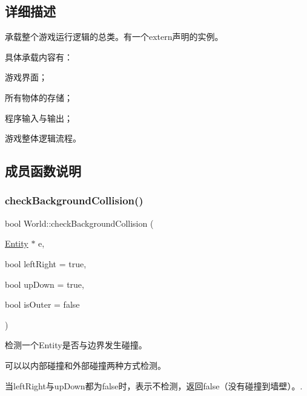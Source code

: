 \subsection{详细描述}
承载整个游戏运行逻辑的总类。有一个extern声明的实例。 

具体承载内容有：
\begin{DoxyEnumerate}
\item 游戏界面；
\item 所有物体的存储；
\item 程序输入与输出；
\item 游戏整体逻辑流程。 
\end{DoxyEnumerate}

\subsection{成员函数说明}
\mbox{\label{class_world_a3b447a1788dc0d2e507dce41486ad1b4}} 
\subsubsection{\texorpdfstring{check\+Background\+Collision()}{checkBackgroundCollision()}}
{\footnotesize\ttfamily bool World\+::check\+Background\+Collision (\begin{DoxyParamCaption}\item[{\hyperlink{class_entity}{Entity} $\ast$}]{e,  }\item[{bool}]{left\+Right = {\ttfamily true},  }\item[{bool}]{up\+Down = {\ttfamily true},  }\item[{bool}]{is\+Outer = {\ttfamily false} }\end{DoxyParamCaption})\hspace{0.3cm}{\ttfamily [private]}}



检测一个\+Entity是否与边界发生碰撞。 

可以以内部碰撞和外部碰撞两种方式检测。

当left\+Right与up\+Down都为false时，表示不检测，返回false（没有碰撞到墙壁）。. 


